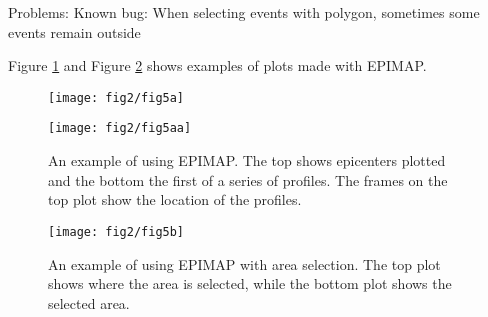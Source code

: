 Problems: Known bug: When selecting events with polygon, sometimes some events remain outside 

Figure 
\ref{fig:epimap}
and Figure 
\ref{fig:epimap-area}
shows examples of plots made with EPIMAP. 


\begin{figure}
\centerline{\texttt{[image: fig2/fig5a]}}
\centerline{\texttt{[image: fig2/fig5aa]}}
\caption{An example of using EPIMAP. The top shows epicenters plotted and the bottom the first of a series of profiles. The frames on the top plot show the location of the profiles. 
}
\label{fig:epimap}
\end{figure}

\begin{figure}
\centerline{\texttt{[image: fig2/fig5b]}}
\caption{An example of using EPIMAP with area selection. The top plot shows where the area is selected, while the bottom plot shows the selected area. 
}
\label{fig:epimap-area}
\end{figure}

